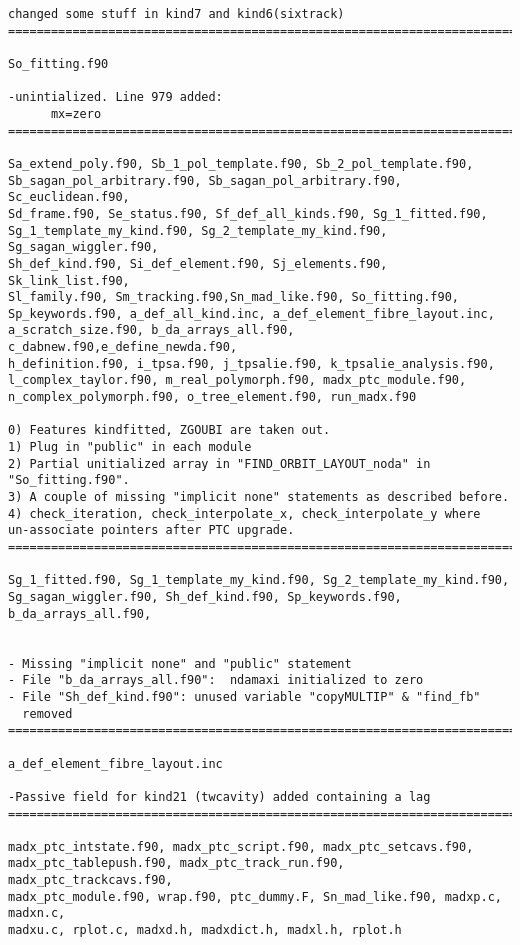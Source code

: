 \begin{verbatim}
changed some stuff in kind7 and kind6(sixtrack)
=============================================================================

So_fitting.f90

-unintialized. Line 979 added:
      mx=zero
=============================================================================

Sa_extend_poly.f90, Sb_1_pol_template.f90, Sb_2_pol_template.f90, 
Sb_sagan_pol_arbitrary.f90, Sb_sagan_pol_arbitrary.f90, Sc_euclidean.f90,
Sd_frame.f90, Se_status.f90, Sf_def_all_kinds.f90, Sg_1_fitted.f90,
Sg_1_template_my_kind.f90, Sg_2_template_my_kind.f90, Sg_sagan_wiggler.f90,
Sh_def_kind.f90, Si_def_element.f90, Sj_elements.f90, Sk_link_list.f90,
Sl_family.f90, Sm_tracking.f90,Sn_mad_like.f90, So_fitting.f90, 
Sp_keywords.f90, a_def_all_kind.inc, a_def_element_fibre_layout.inc,
a_scratch_size.f90, b_da_arrays_all.f90, c_dabnew.f90,e_define_newda.f90,
h_definition.f90, i_tpsa.f90, j_tpsalie.f90, k_tpsalie_analysis.f90, 
l_complex_taylor.f90, m_real_polymorph.f90, madx_ptc_module.f90,
n_complex_polymorph.f90, o_tree_element.f90, run_madx.f90  

0) Features kindfitted, ZGOUBI are taken out.
1) Plug in "public" in each module
2) Partial unitialized array in "FIND_ORBIT_LAYOUT_noda" in "So_fitting.f90".
3) A couple of missing "implicit none" statements as described before.
4) check_iteration, check_interpolate_x, check_interpolate_y where
un-associate pointers after PTC upgrade.
=============================================================================

Sg_1_fitted.f90, Sg_1_template_my_kind.f90, Sg_2_template_my_kind.f90, 
Sg_sagan_wiggler.f90, Sh_def_kind.f90, Sp_keywords.f90, b_da_arrays_all.f90,


- Missing "implicit none" and "public" statement
- File "b_da_arrays_all.f90":  ndamaxi initialized to zero
- File "Sh_def_kind.f90": unused variable "copyMULTIP" & "find_fb"
  removed
=============================================================================

a_def_element_fibre_layout.inc

-Passive field for kind21 (twcavity) added containing a lag
=============================================================================

madx_ptc_intstate.f90, madx_ptc_script.f90, madx_ptc_setcavs.f90,
madx_ptc_tablepush.f90, madx_ptc_track_run.f90, madx_ptc_trackcavs.f90,
madx_ptc_module.f90, wrap.f90, ptc_dummy.F, Sn_mad_like.f90, madxp.c, madxn.c, 
madxu.c, rplot.c, madxd.h, madxdict.h, madxl.h, rplot.h


\end{verbatim}
